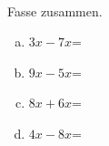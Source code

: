 \begin{aufgabe} ~ \\ 
Fasse zusammen.\begin{multicols}{2} 
\begin{enumerate}[a)] 
\item 
$3x-7x$=
\item 
$9x-5x$=
\item 
$8x+6x$=
\item 
$4x-8x$=
\end{enumerate} 
\end{multicols} 
\end{aufgabe} 
